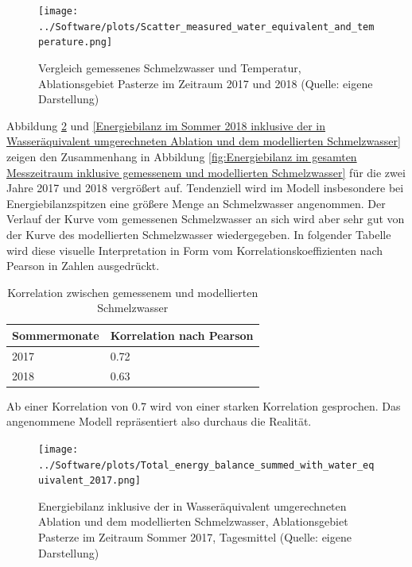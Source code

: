 \documentclass[11pt,a4paper]{article}
\begin{document}
\begin{figure}[H]
\centering
\texttt{[image: ../Software/plots/Scatter\_measured\_water\_equivalent\_and\_temperature.png]}
\caption[Vergleich gemessenes Schmelzwasser und Temperaturtagesmittel, Ablationsgebiet Pasterze im Zeitraum 2017 und 2018]{Vergleich gemessenes Schmelzwasser und Temperatur, Ablationsgebiet Pasterze im Zeitraum 2017 und 2018 (Quelle: eigene Darstellung)}
\label{Vergleich gemessenes Schmelzwasser und Temperatur}
\end{figure}

Abbildung \ref{fig:Energiebilanz im Sommer 2017 inklusive der in Wasseräquivalent umgerechneten Ablation und dem modellierten Schmelzwasser} und \ref{Energiebilanz im Sommer 2018 inklusive der in Wasseräquivalent umgerechneten Ablation und dem modellierten Schmelzwasser} zeigen den Zusammenhang in Abbildung \ref{fig:Energiebilanz im gesamten Messzeitraum inklusive gemessenem und modellierten Schmelzwasser} für die zwei Jahre 2017 und 2018 vergrößert auf. Tendenziell wird im Modell insbesondere bei Energiebilanzspitzen eine größere Menge an Schmelzwasser angenommen. Der Verlauf der Kurve vom gemessenen Schmelzwasser an sich wird aber sehr gut von der Kurve des modellierten Schmelzwasser wiedergegeben. In folgender Tabelle wird diese visuelle Interpretation in Form vom Korrelationskoeffizienten nach Pearson in Zahlen ausgedrückt. 


\begin{table}[H]
\centering
{} 
\caption{Korrelation zwischen gemessenem und modellierten Schmelzwasser}
\label{tab:Korrelation zwischen gemessenem und modellierten Schmelzwasser}
\begin{tabular}{|l|l|}
\hline
Sommermonate & Korrelation nach Pearson \\ \hline
2017         & 0.72                     \\ \hline
2018         & 0.63                     \\ \hline
\end{tabular}
\end{table}

Ab einer Korrelation von 0.7 wird von einer starken Korrelation gesprochen. Das angenommene Modell repräsentiert also durchaus die Realität.

\begin{figure}[H]
\centering
\texttt{[image: ../Software/plots/Total\_energy\_balance\_summed\_with\_water\_equivalent\_2017.png]}
\caption[Energiebilanz inklusive der in Wasseräquivalent umgerechneten Ablation und dem modellierten Schmelzwasser, Ablationsgebiet Pasterze im Zeitraum Sommer 2017, Tagesmittel]{Energiebilanz inklusive der in Wasseräquivalent umgerechneten Ablation und dem modellierten Schmelzwasser, Ablationsgebiet Pasterze im Zeitraum Sommer 2017, Tagesmittel (Quelle: eigene Darstellung)}
\label{fig:Energiebilanz im Sommer 2017 inklusive der in Wasseräquivalent umgerechneten Ablation und dem modellierten Schmelzwasser}
\end{figure}
\end{document}
